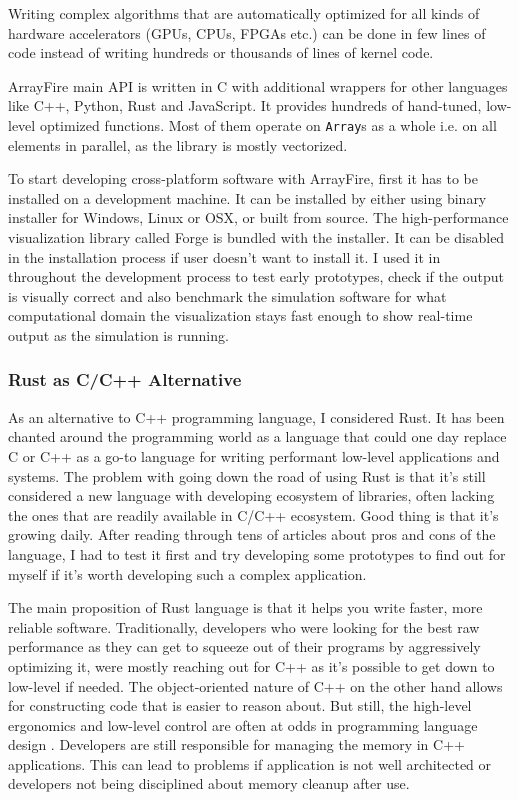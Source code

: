 Writing complex algorithms that are automatically optimized for all kinds of hardware accelerators (GPUs, CPUs, FPGAs etc.) can be done in few lines of code instead of writing hundreds or thousands of lines of kernel code. 

ArrayFire main API is written in C with additional wrappers for other languages like C++, Python, Rust and JavaScript. It provides hundreds of hand-tuned, low-level optimized functions.  Most of them operate on \texttt{Array}s as a whole i.e. on all elements in parallel, as the library is mostly vectorized.

To start developing cross-platform software with ArrayFire, first it has to be installed on a development machine. It can be installed by either using binary installer for Windows, Linux or OSX, or built from source. The high-performance visualization library called Forge is bundled with the installer. It can be disabled in the installation process if user doesn't want to install it. I used it in throughout the development process to test early prototypes, check if the output is visually correct and also benchmark the simulation software for what computational domain the visualization stays fast enough to show real-time output as the simulation is running.

\subsubsection{Rust as C/C++ Alternative}\label{sec:rust-alt}
As an alternative to C++ programming language, I considered Rust. It has been chanted around the programming world as a language that could one day replace C or C++ as a go-to language for writing performant low-level applications and systems. The problem with going down the road of using Rust is that it's still considered a new language with developing ecosystem of libraries, often lacking the ones that are readily available in C/C++ ecosystem. Good thing is that it's growing daily. After reading through tens of articles about pros and cons of the language, I had to test it first and try developing some prototypes to find out for myself if it's worth developing such a complex application.

The main proposition of Rust language is that it helps you write faster, more reliable software. Traditionally, developers who were looking for the best raw performance as they can get to squeeze out of their programs by aggressively optimizing it, were mostly reaching out for C++ as it's possible to get down to low-level if needed. The object-oriented nature of C++ on the other hand allows for constructing code that is easier to reason about. But still, the high-level ergonomics and low-level control are often at odds in programming language design \citep{steveklabnik2018}. Developers are still responsible for managing the memory in C++ applications. This can lead to problems if application is not well architected or developers not being disciplined about memory cleanup after use.


